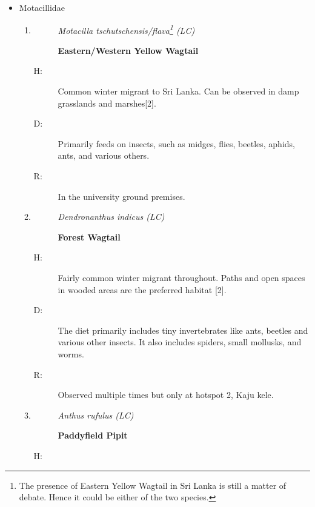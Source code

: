 \begin{itemize}
\begin{enumerate}
\begin{description}
\end{description}%
\end{enumerate}%
\item%
Motacillidae%
\begin{enumerate}%
\item%
\begin{description}%
\item[]%
\textit{Motacilla tschutschensis/flava\footnote{The presence of Eastern Yellow Wagtail in Sri Lanka is still a matter of debate. Hence it could be either of the two species. } (LC)}%
\item[]%
\textbf{Eastern/Western Yellow Wagtail}%
\end{description}%
\begin{description}%
\item[H: ]%
Common winter migrant to Sri Lanka. Can be observed in damp grasslands and marshes{[}2{]}.%
\item[D: ]%
Primarily feeds on insects, such as midges, flies, beetles, aphids, ants, and various others.%
\item[R: ]%
In the university ground premises.%
\end{description}%
\item%
\begin{description}%
\item[]%
\textit{Dendronanthus indicus (LC)}%
\item[]%
\textbf{Forest Wagtail}%
\end{description}%
\begin{description}%
\item[H: ]%
Fairly common winter migrant throughout. Paths and open spaces in wooded areas are the preferred habitat
{[}2{]}.%
\item[D: ]%
The diet primarily includes tiny invertebrates like ants, beetles and various other insects. It also includes spiders, small mollusks, and worms.%
\item[R: ]%
Observed multiple times but only at hotspot 2, Kaju kele.%
\end{description}%
\item%
\begin{description}%
\item[]%
\textit{Anthus rufulus (LC)}%
\item[]%
\textbf{Paddyfield Pipit}%
\end{description}%
\begin{description}%
\item[H: ]%

\end{description}
\end{enumerate}
\end{itemize}
